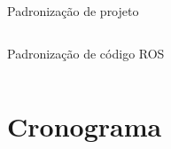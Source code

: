 \documentclass{if-beamer}
\begin{document}
\begin{frame}{Padronização de projeto}
\begin{columns}
\begin{column}{0.45\textwidth}
\begin{block}{Padronização de código ROS}
\begin{itemize}
				\end{itemize}
				
			\end{block}
			
		\end{column}
		
	\end{columns}

	\vspace{5mm}

	
\end{frame}


\section{Cronograma}
\end{document}
